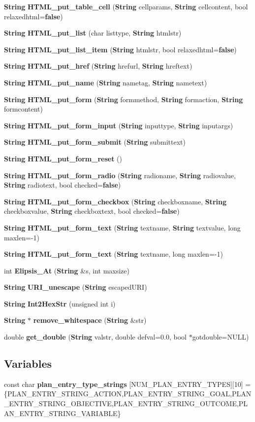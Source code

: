\begin{CompactItemize}
\item 
{\bf String} {\bf HTML\_\-put\_\-table\_\-cell} ({\bf String} cellparams, {\bf String} cellcontent, bool relaxedhtml={\bf false})
\item 
{\bf String} {\bf HTML\_\-put\_\-list} (char listtype, {\bf String} htmlstr)
\item 
{\bf String} {\bf HTML\_\-put\_\-list\_\-item} ({\bf String} htmlstr, bool relaxedhtml={\bf false})
\item 
{\bf String} {\bf HTML\_\-put\_\-href} ({\bf String} hrefurl, {\bf String} hreftext)
\item 
{\bf String} {\bf HTML\_\-put\_\-name} ({\bf String} nametag, {\bf String} nametext)
\item 
{\bf String} {\bf HTML\_\-put\_\-form} ({\bf String} formmethod, {\bf String} formaction, {\bf String} formcontent)
\item 
{\bf String} {\bf HTML\_\-put\_\-form\_\-input} ({\bf String} inputtype, {\bf String} inputargs)
\item 
{\bf String} {\bf HTML\_\-put\_\-form\_\-submit} ({\bf String} submittext)
\item 
{\bf String} {\bf HTML\_\-put\_\-form\_\-reset} ()
\item 
{\bf String} {\bf HTML\_\-put\_\-form\_\-radio} ({\bf String} radioname, {\bf String} radiovalue, {\bf String} radiotext, bool checked={\bf false})
\item 
{\bf String} {\bf HTML\_\-put\_\-form\_\-checkbox} ({\bf String} checkboxname, {\bf String} checkboxvalue, {\bf String} checkboxtext, bool checked={\bf false})
\item 
{\bf String} {\bf HTML\_\-put\_\-form\_\-text} ({\bf String} textname, {\bf String} textvalue, long maxlen=-1)
\item 
{\bf String} {\bf HTML\_\-put\_\-form\_\-text} ({\bf String} textname, long maxlen=-1)
\item 
int {\bf Elipsis\_\-At} ({\bf String} \&s, int maxsize)
\item 
{\bf String} {\bf URI\_\-unescape} ({\bf String} escaped\-URI)
\item 
{\bf String} {\bf Int2Hex\-Str} (unsigned int i)
\item 
{\bf String} $\ast$ {\bf remove\_\-whitespace} ({\bf String} \&str)
\item 
double {\bf get\_\-double} ({\bf String} valstr, double defval=0.0, bool $\ast$gotdouble=NULL)
\end{CompactItemize}
\subsection*{Variables}
\begin{CompactItemize}
\item 
const char {\bf plan\_\-entry\_\-type\_\-strings} [NUM\_\-PLAN\_\-ENTRY\_\-TYPES][10] = \{PLAN\_\-ENTRY\_\-STRING\_\-ACTION,PLAN\_\-ENTRY\_\-STRING\_\-GOAL,PLAN\_\-ENTRY\_\-STRING\_\-OBJECTIVE,PLAN\_\-ENTRY\_\-STRING\_\-OUTCOME,PLAN\_\-ENTRY\_\-STRING\_\-VARIABLE\}
\end{CompactItemize}


